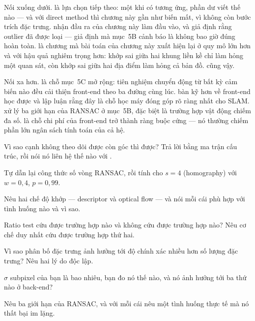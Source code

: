 \documentclass[../../vslam.tex]{subfiles}
\begin{document}
Nối xuống dưới.  là lựa chọn tiếp theo: một khi có tương ứng, phần dư viết thế nào --- và với direct method thì chương này gần như biến mất, vì không còn bước trích đặc trưng.  nhận đầu ra của chương này làm đầu vào, và giả định rằng outlier đã được loại --- giả định mà mục~5B cảnh báo là không bao giờ đúng hoàn toàn.  là chương mà bài toán của chương này xuất hiện lại ở quy mô lớn hơn và với hậu quả nghiêm trọng hơn: khớp sai giữa hai khung liền kề chỉ làm hỏng một quan sát, còn khớp sai giữa hai địa điểm làm hỏng cả bản đồ.  cũng vậy.

Nối xa hơn.  là chỗ mục~5C mở rộng: tiên nghiệm chuyển động từ bất kỳ cảm biến nào đều cải thiện front-end theo ba đường cùng lúc.  bàn kỹ hơn về front-end học được và lập luận rằng đây là chỗ học máy đóng góp rõ ràng nhất cho SLAM.  xử lý ba giới hạn của RANSAC ở mục~5B, đặc biệt là trường hợp vật động chiếm đa số.  là chỗ chi phí của front-end trở thành ràng buộc cứng --- nó thường chiếm phần lớn ngân sách tính toán của cả hệ.

\begin{tukiem}
\item Vì sao cạnh không theo dõi được còn góc thì được? Trả lời bằng ma trận cấu trúc, rồi nói nó liên hệ thế nào với .
\item Tự dẫn lại công thức số vòng RANSAC, rồi tính cho \(s=4\) (homography) với \(w=0{,}4\), \(p=0{,}99\).
\item Nêu hai chế độ khớp --- descriptor và optical flow --- và nói mỗi cái phù hợp với tình huống nào và vì sao.
\item Ratio test cứu được trường hợp nào và không cứu được trường hợp nào? Nêu cơ chế duy nhất cứu được trường hợp thứ hai.
\item Vì sao phân bố đặc trưng ảnh hưởng tới độ chính xác nhiều hơn số lượng đặc trưng? Nêu hai lý do độc lập.
\item \(\sigma\) subpixel của bạn là bao nhiêu, bạn đo nó thế nào, và nó ảnh hưởng tới ba thứ nào ở back-end?
\item Nêu ba giới hạn của RANSAC, và với mỗi cái nêu một tình huống thực tế mà nó thất bại im lặng.
\end{tukiem}
\ifSubfilesClassLoaded{\printbibliography[title={Nguồn}]}{}
\end{document}
